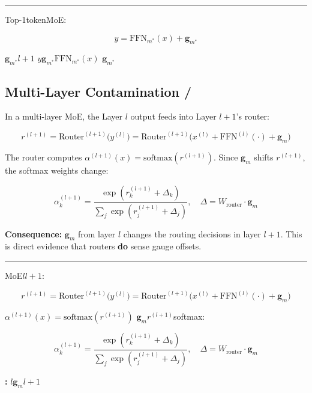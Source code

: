 \documentclass[11pt,a4paper]{article}
\newcommand{\gauge}{\mathbf{g}}
\begin{document}
\medskip
\noindent\rule{\textwidth}{0.5pt}
Top-1tokenMoE:

\begin{equation}
    y = \text{FFN}_{m^*}(x) + \gauge_{m^*}
\end{equation}

$\gauge_{m^*}$\textbf{}$l+1$
$y$$\gauge_{m^*}$$\text{FFN}_{m^*}(x)$
$\gauge_{m^*}$

\subsection{Multi-Layer Contamination / }

In a multi-layer MoE, the Layer $l$ output feeds into Layer $l+1$'s router:

\begin{equation}
    r^{(l+1)} = \text{Router}^{(l+1)}\bigl(y^{(l)}\bigr)
              = \text{Router}^{(l+1)}\bigl(x^{(l)} + \text{FFN}^{(l)}(\cdot) + \gauge_m\bigr)
\end{equation}

The router computes $\alpha^{(l+1)}(x) = \text{softmax}(r^{(l+1)})$.
Since $\gauge_m$ shifts $r^{(l+1)}$, the softmax weights change:

\begin{equation}
    \alpha^{(l+1)}_k = \frac{\exp(r^{(l+1)}_k + \Delta_k)}{\sum_j \exp(r^{(l+1)}_j + \Delta_j)},
    \quad \Delta = W_{\text{router}} \cdot \gauge_m
\end{equation}

\textbf{Consequence:} $\gauge_m$ from layer $l$ changes the routing decisions
in layer $l+1$. This is direct evidence that routers \textbf{do} sense gauge offsets.

\medskip
\noindent\rule{\textwidth}{0.5pt}
MoE$l$$l+1$:

\begin{equation}
    r^{(l+1)} = \text{Router}^{(l+1)}\bigl(y^{(l)}\bigr)
              = \text{Router}^{(l+1)}\bigl(x^{(l)} + \text{FFN}^{(l)}(\cdot) + \gauge_m\bigr)
\end{equation}

$\alpha^{(l+1)}(x) = \text{softmax}(r^{(l+1)})$
$\gauge_m$$r^{(l+1)}$softmax:

\begin{equation}
    \alpha^{(l+1)}_k = \frac{\exp(r^{(l+1)}_k + \Delta_k)}{\sum_j \exp(r^{(l+1)}_j + \Delta_j)},
    \quad \Delta = W_{\text{router}} \cdot \gauge_m
\end{equation}

\textbf{:} $l$$\gauge_m$$l+1$
\textbf{}
\end{document}
